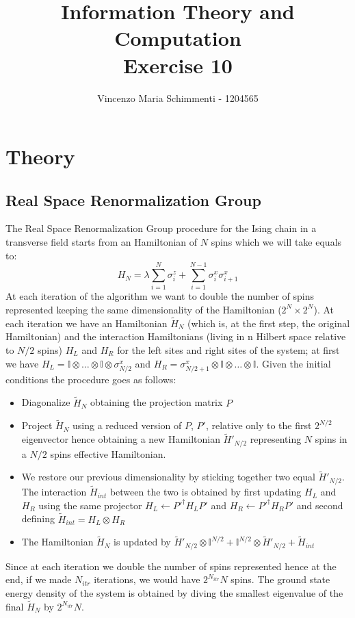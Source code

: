 \documentclass{article}
\title{%
	Information Theory and Computation \\
	Exercise  10}
\author{Vincenzo Maria Schimmenti - 1204565}
\begin{document}
\maketitle
 
\section*{Theory}
\subsection*{Real Space Renormalization Group}
The Real Space Renormalization Group procedure for the Ising chain in a transverse field starts from an Hamiltonian of $N$ spins which we will take equals to:
\begin{equation*}
	H_N = \lambda \sum_{i=1}^N \sigma^z_i + \sum_{i=1}^{N-1} \sigma^x_i \sigma^x_{i+1}
\end{equation*}
At each iteration of the algorithm we want to double the number of spins represented keeping the same dimensionality of the Hamiltonian ($2^N \times 2^N$). At each iteration we have an Hamiltonian $\tilde{H}_N$ (which is, at the first step, the original Hamiltonian) and the interaction Hamiltonians (living in n Hilbert space relative to $N/2$ spins) $H_L$ and $H_R$ for the left sites and right sites of the system; at first we have $H_L=\mathbb{I} \otimes \dots \otimes \mathbb{I} \otimes \sigma^x_{N/2}$ and $H_R=\sigma^x_{N/2+1} \otimes \mathbb{I} \otimes \dots \otimes \mathbb{I}$. Given the initial conditions the procedure goes as follows:
\begin{itemize}
	\item Diagonalize  $\tilde{H}_N$ obtaining the projection matrix $P$\
	\item Project  $\tilde{H}_N$ using a reduced version of $P$, $P'$, relative only to the first $2^{N/2}$ eigenvector hence obtaining a new Hamiltonian  $\tilde{H}'_{N/2}$ representing $N$ spins in a $N/2$ spins effective Hamiltonian.
	\item We restore our previous dimensionality by sticking together two equal $\tilde{H}'_{N/2}$. The interaction $\tilde{H}_{int}$ between the two is obtained by first updating $H_L$ and $H_R$ using the same projector $H_L \leftarrow P'^\dagger H_L P'$ and $H_R \leftarrow P'^\dagger H_R P'$ and second defining $\tilde{H}_{int}=H_L \otimes H_R$
	\item The Hamiltonian $\tilde{H}_N$ is updated by $\tilde{H}'_{N/2} \otimes \mathbb{I}^{N/2}+ \mathbb{I}^{N/2} \otimes \tilde{H}'_{N/2} + \tilde{H}_{int}$
\end{itemize}
Since at each iteration we double the number of spins represented hence at the end, if we made $N_{itr}$ iterations, we would have $2^{N_{itr}} N$ spins. The ground state energy density of the system is obtained by diving the smallest eigenvalue of the final $\tilde{H}_N$ by $2^{N_{itr} } N$.
\end{document}
